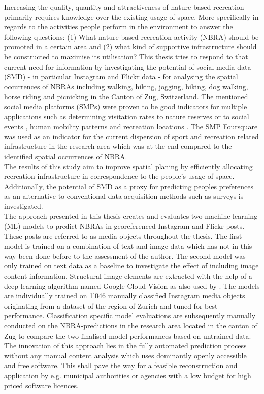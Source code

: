 Increasing the quality, quantity and attractiveness of nature-based recreation primarily requires knowledge over the existing usage of space. More specifically in regards to the activities people perform in the environment to answer the following questions: (1) What nature-based recreation activity (NBRA) should be promoted in a certain area and (2) what kind of supportive infrastructure should be constructed to maximise its utilisation? This thesis tries to respond to that current need for information by investigating the potential of social media data (SMD) - in particular Instagram and Flickr data - for analysing the spatial occurrences of NBRAs including walking, hiking, jogging, biking, dog walking, horse riding and picnicking in the Canton of Zug, Switzerland. The mentioned social media platforms (SMPs) were proven to be good indicators for multiple applications such as determining visitation rates to nature reserves \parencite{Tenkanen2017, Heikinheimo2017, Keeler2015, Wood2013} or to social events \parencite{Pettersson2011}, human mobility patterns \parencite{Barchiesi2015, Grossenbacher2014} and recreation locations \parencite{Weyland2014, Hill2006, Neuvonen2010}. The SMP Foursquare was used as an indicator for the current dispersion of sport and recreation related infrastructure in the research area which was at the end compared to the identified spatial occurrences of NBRA.\\
The results of this study aim to improve spatial planing by efficiently allocating recreation infrastructure in correspondence to the people's usage of space. Additionally, the potential of SMD as a proxy for predicting peoples preferences as an alternative to conventional data-acquisition methods such as surveys is investigated.\\
\newline
The approach presented in this thesis creates and evaluates two machine learning (ML) models to predict NBRAs in georeferenced Instagram and Flickr posts. These posts are referred to as media objects throughout the thesis. The first model is trained on a combination of text and image data which has not in this way been done before to the assessment of the author. The second model was only trained on text data as a baseline to investigate the effect of including image content information. Structural image elements are extracted with the help of a deep-learning algorithm named Google Cloud Vision as also used by \parencite{Richards2018}. The models are individually trained on 1'046 manually classified Instagram media objects originating from a dataset of the region of Zurich \parencite{Gruzd2016} and tuned for best performance. Classification specific model evaluations are subsequently manually conducted on the NBRA-predictions in the research area located in the canton of Zug to compare the two finalised model performances based on untrained data. The innovation of this approach lies in the fully automated prediction process without any manual content analysis which uses dominantly openly accessible and free software. This shall pave the way for a feasible reconstruction and application by e.g. municipal authorities or agencies with a low budget for high priced software licences.
